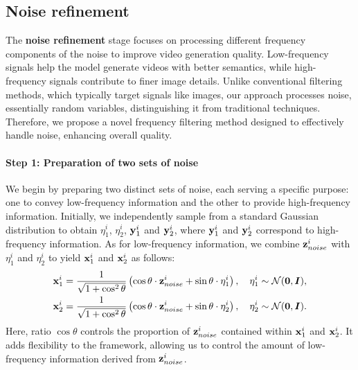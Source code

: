 \subsection{Noise refinement}
\label{subsec:noise_refinement}
The \textbf{noise refinement} stage focuses on processing different frequency components of the noise to improve video generation quality. 
Low-frequency signals help the model generate videos with better semantics, while high-frequency signals contribute to finer image details.
Unlike conventional filtering methods, which typically target signals like images, our approach processes noise, essentially random variables, distinguishing it from traditional techniques.
Therefore, we propose a novel frequency filtering method designed to effectively handle noise, enhancing overall quality.

\paragraph{Step 1: Preparation of two sets of noise} 
We begin by preparing two distinct sets of noise, each serving a specific purpose: one to convey low-frequency information and the other to provide high-frequency information.
Initially, we independently sample from a standard Gaussian distribution to obtain $\eta_1^i$, $\eta_2^i$, $\mathbf{y}_1^i$ and $\mathbf{y}_2^i$, where $\mathbf{y}_1^i$ and $\mathbf{y}_2^i$ correspond to high-frequency information. 
As for low-frequency information,
we combine $\mathbf{z}_{noise}^i$ with $\eta_1^i$ and $\eta_2^i$ to yield $\mathbf{x}_1^i$ and $\mathbf{x}_2^i$ as follows:
\begin{equation}
\label{eq:method_X}
\begin{split}
    \mathbf{x}_1^i &= \frac{1}{\sqrt{1+\cos^2\theta}}\left(\cos\theta\cdot \mathbf{z}_{noise}^i+\sin\theta\cdot\eta_1^i\right),\quad \eta_1^i\sim \mathcal{N}(\mathbf{0},{\bm{I}}), \\
    \mathbf{x}_2^i &= \frac{1}{\sqrt{1+\cos^2\theta}}\left(\cos\theta\cdot \mathbf{z}_{noise}^i+\sin\theta\cdot\eta_2^i\right),\quad \eta_2^i\sim \mathcal{N}(\mathbf{0},{\bm{I}}).
\end{split}
\end{equation}
Here, ratio $\cos\theta$ controls the proportion of $\mathbf{z}_{noise}^i$ contained within $\mathbf{x}_1^i$ and $\mathbf{x}_2^i$. It adds flexibility to the framework, allowing us to control the amount of low-frequency information derived from $\mathbf{z}_{noise}^i$.

